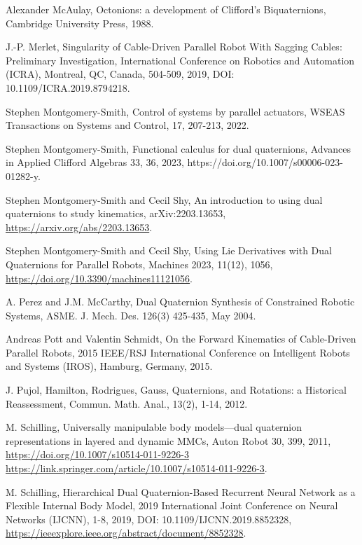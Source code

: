 \documentclass[reqno,12pt]{amsart}
\begin{document}
\begin{thebibliography}{99}
 Alexander McAulay, Octonions: a development of Clifford's Biquaternions, Cambridge University Press, 1988.

 J.-P. Merlet, Singularity of Cable-Driven Parallel Robot With Sagging Cables: Preliminary Investigation, International Conference on Robotics and Automation (ICRA), Montreal, QC, Canada, 504-509, 2019, DOI: 10.1109/ICRA.2019.8794218.

 Stephen Montgomery-Smith, Control of systems by parallel actuators, WSEAS Transactions on Systems and Control, 17, 207-213, 2022.

 Stephen Montgomery-Smith, Functional calculus for dual quaternions, Advances in Applied Clifford Algebras 33, 36, 2023, https://doi.org/10.1007/s00006-023-01282-y.

 Stephen Montgomery-Smith and Cecil Shy, An introduction to using dual quaternions to study kinematics, arXiv:2203.13653, \url{https://arxiv.org/abs/2203.13653}.

 Stephen Montgomery-Smith and Cecil Shy, Using Lie Derivatives with Dual Quaternions for Parallel Robots, Machines 2023, 11(12), 1056, \url{https://doi.org/10.3390/machines11121056}.

 A. Perez and J.M. McCarthy, Dual Quaternion Synthesis of Constrained Robotic Systems, ASME. J. Mech. Des. 126(3) 425-435, May 2004.

 Andreas Pott and Valentin Schmidt, On the Forward Kinematics of Cable-Driven Parallel Robots, 2015 IEEE/RSJ International Conference on Intelligent Robots and Systems (IROS), Hamburg, Germany, 2015.

 J. Pujol, Hamilton, Rodrigues, Gauss, Quaternions, and Rotations: a Historical Reassessment, Commun. Math. Anal., 13(2), 1-14, 2012.

  M. Schilling, Universally manipulable body models---dual quaternion representations in layered and dynamic MMCs, Auton Robot 30, 399, 2011, \url{https://doi.org/10.1007/s10514-011-9226-3 https://link.springer.com/article/10.1007/s10514-011-9226-3}.

 M. Schilling, Hierarchical Dual Quaternion-Based Recurrent Neural Network as a Flexible Internal Body Model, 2019 International Joint Conference on Neural Networks (IJCNN), 1-8, 2019, DOI: 10.1109/IJCNN.2019.8852328, \url{https://ieeexplore.ieee.org/abstract/document/8852328}.


\end{thebibliography}
\end{document}
